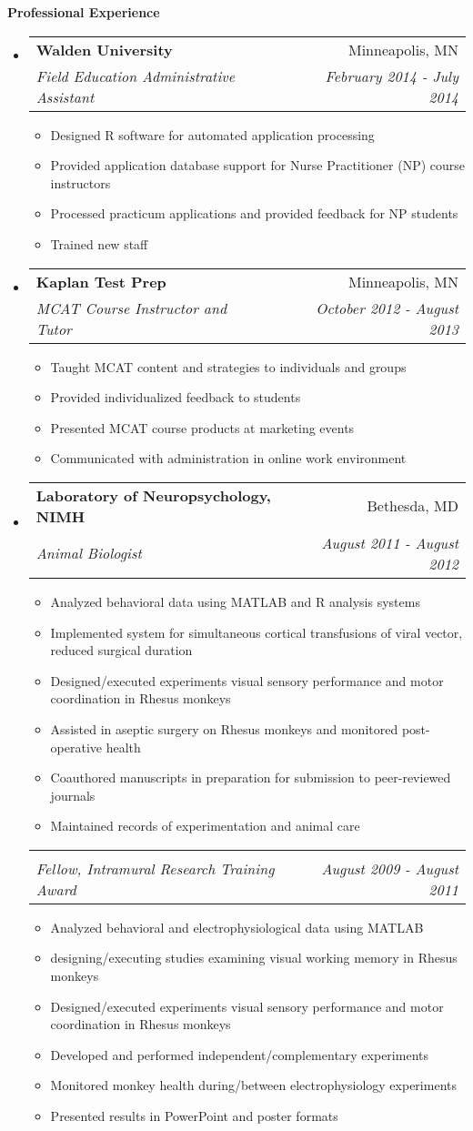 \documentclass[letterpaper,11pt]{article}
\makeatletter
\newcommand{\resitem}[1]{\item #1 \vspace{-2pt}}
\newcommand{\resheading}[1]{{\large \colorbox{mygrey}{\begin{minipage}{\textwidth}{\textbf{#1 \vphantom{p\^{E}}}}\end{minipage}}}}
\newcommand{\ressubheading}[4]{
\begin{tabular*}{7.0in}{l@{\extracolsep{\fill}}r}
    \textbf{#1} & #2 \\
    \textit{#3} & \textit{#4} \\
\end{tabular*}\vspace{-6pt}}
\makeatother
\begin{document}

\resheading{Professional Experience}
\begin{itemize}

\item
\ressubheading{Walden University}{Minneapolis, MN}{Field Education Administrative Assistant}{February 2014 - July 2014}
\begin{itemize}
\resitem{Designed R software for automated application processing}
\resitem{Provided application database support for Nurse Practitioner (NP) course instructors}
\resitem{Processed practicum applications and provided feedback for NP students}
\resitem{Trained new staff}
\end{itemize}

\item
\ressubheading{Kaplan Test Prep}{Minneapolis, MN}{MCAT Course Instructor and Tutor}{October 2012 - August 2013}
\begin{itemize}
\resitem{Taught MCAT content and strategies to individuals and groups}
\resitem{Provided individualized feedback to students}
\resitem{Presented MCAT course products at marketing events}
\resitem{Communicated with administration in online work environment}
\end{itemize}

\item
\ressubheading{Laboratory of Neuropsychology, NIMH}{Bethesda, MD}{Animal Biologist}{August 2011 - August 2012}
\begin{itemize}
\resitem{Analyzed behavioral data using MATLAB and R analysis systems}
\resitem{Implemented system for simultaneous cortical transfusions of viral vector, reduced surgical duration}
\resitem{Designed/executed experiments visual sensory performance and motor coordination in Rhesus monkeys}
\resitem{Assisted in aseptic surgery on Rhesus monkeys and monitored post-operative health}
\resitem{Coauthored manuscripts in preparation for submission to peer-reviewed journals}
\resitem{Maintained records of experimentation and animal care}
\end{itemize}

\newpage

\ressubheading{}{}{Fellow, Intramural Research Training Award}{August 2009 - August 2011}
\begin{itemize}
\resitem{Analyzed behavioral and electrophysiological data using MATLAB}
\resitem{designing/executing studies examining visual working memory in Rhesus monkeys}
\resitem{Designed/executed experiments visual sensory performance and motor coordination in Rhesus monkeys}
\resitem{Developed and performed independent/complementary experiments}
\resitem{Monitored monkey health during/between electrophysiology experiments}
\resitem{Presented results in PowerPoint and poster formats}
\end{itemize}

\end{itemize}
\end{document}
